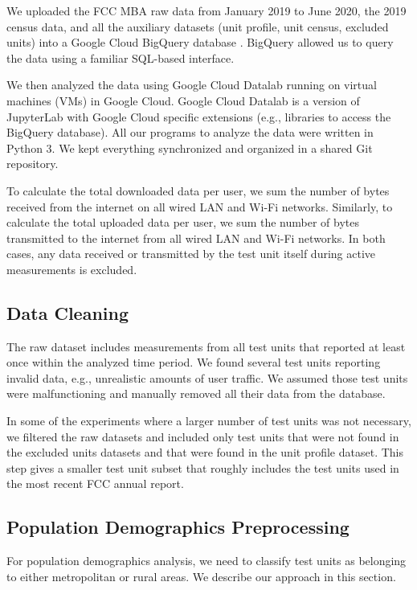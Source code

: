 \documentclass[conference,10pt]{IEEEtran}
\begin{document}
We uploaded the FCC MBA raw data from January 2019 to June 2020, the 2019 census data, and all the auxiliary datasets (unit profile, unit census, excluded units) into a Google Cloud BigQuery database \cite{bigquery}. BigQuery allowed us to query the data using a familiar SQL-based interface.

We then analyzed the data using Google Cloud Datalab \cite{datalab} running on virtual machines (VMs) in Google Cloud. Google Cloud Datalab is a version of JupyterLab \cite{jupyter} with Google Cloud specific extensions (e.g., libraries to access the BigQuery database). All our programs to analyze the data were written in Python 3. We kept everything synchronized and organized in a shared Git repository.

To calculate the total downloaded data per user, we sum the number of bytes received from the internet on all wired LAN and Wi-Fi networks. Similarly, to calculate the total uploaded data per user, we sum the number of bytes transmitted to the internet from all wired LAN and Wi-Fi networks. In both cases, any data received or transmitted by the test unit itself during active measurements is excluded.


\subsection{Data Cleaning}

The raw dataset includes measurements from all test units that reported at least once within the analyzed time period. We found several test units reporting invalid data, e.g., unrealistic amounts of user traffic. We assumed those test units were malfunctioning and manually removed all their data from the database.

In some of the experiments where a larger number of test units was not necessary, we filtered the raw datasets and included only test units that were not found in the excluded units datasets and that were found in the unit profile dataset. This step gives a smaller test unit subset that roughly includes the test units used in the most recent FCC annual report.

\subsection{Population Demographics Preprocessing}

For population demographics analysis, we need to classify test units as belonging to either metropolitan or rural areas. We describe our approach in this section.
\end{document}
